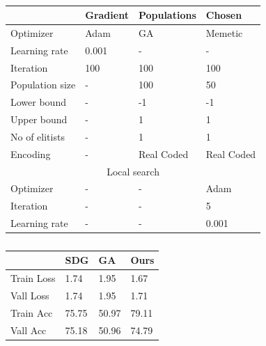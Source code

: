 \documentclass[conference]{IEEEtran}
\begin{document}
\begin{center}
\begin{table}
\begin{tabular}{ |p{2.5cm}||p{1.5cm}|p{1.5cm}|p{1.5cm}|  }

 \hline
 & Gradient & Populations&Chosen\\
 \hline
 Optimizer   & Adam    &GA&   Memetic\\
 Learning rate&   0.001  &-   &-\\
 Iteration &100 & 100&  100\\
 Population size   &-& 100& 50\\
 Lower bound&   -  & -1 &-1\\
 Upper bound& -  & 1   &1\\
 No of elitists& -  & 1&1\\
 Encoding & -  &  Real Coded& Real Coded\\
 \hline
 \multicolumn{4}{|c|}{Local search} \\
 \hline
 Optimizer& -  & - & Adam\\
 Iteration& -  & -&5\\
 Learning rate& -  & -&0.001\\
 \hline
\end{tabular}
\caption {}
\label{tab1}
\end{table}
\end{center}




\begin{center}

\begin{table}
\begin{tabular}{ |p{2.5cm}||p{1cm}||p{1cm}|p{1cm}| }
\hline

&SDG &GA &Ours\\
\hline
Train Loss&   1.74&1.95&1.67\\
Vall Loss&  1.74&1.95&1.71\\
Train Acc& 75.75&50.97&79.11\\
Vall Acc& 75.18&50.96&74.79\\
\hline
\end{tabular}
\label{tab1}
\caption {}
\end{table}
\end{center}
\end{document}
